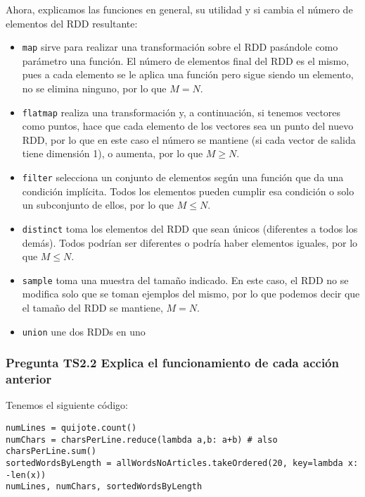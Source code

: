 \documentclass[11pt]{article}
\def\inline{\lstinline[basicstyle=\ttfamily,keywordstyle={}]}
\begin{document}
Ahora, explicamos las funciones en general, su utilidad y si cambia el número de elementos del RDD resultante:

\begin{itemize}
	\item \inline{map} sirve para realizar una transformación sobre el RDD pasándole como parámetro una función. El número de elementos final del RDD es el mismo, pues a cada elemento se le aplica una función pero sigue siendo un elemento, no se elimina ninguno, por lo que $M=N$.
	
	\item \inline{flatmap} realiza una transformación y, a continuación, si tenemos vectores como puntos, hace que cada elemento de los vectores sea un punto del nuevo RDD, por lo que en este caso el número se mantiene (si cada vector de salida tiene dimensión 1), o aumenta, por lo que $M \geq N$.
	
	\item \inline{filter} selecciona un conjunto de elementos según una función que da una condición implícita. Todos los elementos pueden cumplir esa condición o solo un subconjunto de ellos, por lo que $M \leq N$.
	
	\item \inline{distinct} toma los elementos del RDD que sean únicos (diferentes a todos los demás). Todos podrían ser diferentes o podría haber elementos iguales, por lo que $M \leq N$.
	
	\item \inline{sample} toma una muestra del tamaño indicado. En este caso, el RDD no se modifica solo que se toman ejemplos del mismo, por lo que podemos decir que el tamaño del RDD se mantiene, $M=N$.
	
	\item \inline{union} une dos RDDs en uno
\end{itemize}

\subsubsection*{ Pregunta TS2.2 Explica el funcionamiento de cada acción anterior }

Tenemos el siguiente código:
\begin{verbatim}
numLines = quijote.count()
numChars = charsPerLine.reduce(lambda a,b: a+b) # also charsPerLine.sum()
sortedWordsByLength = allWordsNoArticles.takeOrdered(20, key=lambda x: -len(x))
numLines, numChars, sortedWordsByLength
\end{verbatim}
\end{document}
